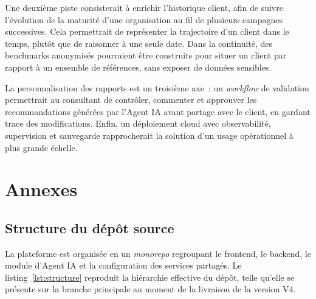 \documentclass[12pt,a4paper]{report}
\begin{document}
Une deuxième piste consisterait à enrichir l'historique client, afin de suivre l'évolution de la maturité d'une organisation au fil de plusieurs campagnes successives. Cela permettrait de représenter la trajectoire d'un client dans le temps, plutôt que de raisonner à une seule date. Dans la continuité, des benchmarks anonymisés pourraient être construits pour situer un client par rapport à un ensemble de références, sans exposer de données sensibles.

La personnalisation des rapports est un troisième axe~: un \textit{workflow} de validation permettrait au consultant de contrôler, commenter et approuver les recommandations générées par l'Agent IA avant partage avec le client, en gardant trace des modifications. Enfin, un déploiement cloud avec observabilité, supervision et sauvegarde rapprocherait la solution d'un usage opérationnel à plus grande échelle.

\renewcommand{\bibname}{Références bibliographiques et webographiques}



\appendix
\chapter{Annexes}

\section{Structure du dépôt source}
La plateforme est organisée en un \textit{monorepo} regroupant le frontend, le backend, le module d'Agent IA et la configuration des services partagés. Le listing~\ref{lst:structure} reproduit la hiérarchie effective du dépôt, telle qu'elle se présente sur la branche principale au moment de la livraison de la version V4.
\end{document}
